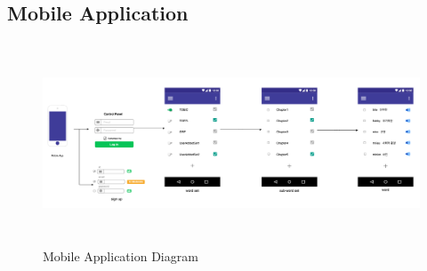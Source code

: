 \documentclass[conference]{IEEEtran}
\begin{document}
\subsection{Mobile Application}
\begin{figure}[h]
    \centering
    \hfill
    \includegraphics[width=\textwidth,height=6cm]{images/diagram_app.png}
    \hfill
    \caption{Mobile Application Diagram}
\end{figure}
\end{document}
